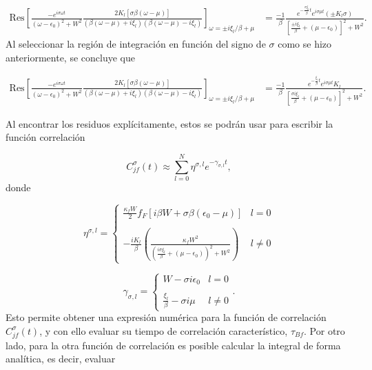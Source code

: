 \begin{appendixs}
\begin{align*}
    \text{Res} \left[ \frac{-e^{i\sigma \omega t}}{(\omega - \epsilon_{0})^{2} + W^{2} } \frac{ 2K_{l}[\sigma \beta (\omega-\mu)] }{ (\beta(\omega-\mu) + i \xi_{l} )(\beta(\omega-\mu) - i \xi_{l})} \right]_{\omega = \pm i \xi_{l}/\beta + \mu} & = \frac{-1}{\beta} \frac{e^{- \frac{\sigma \xi_{l}}{\beta}t} e^{i\sigma \mu t}(\pm K_{l}\sigma )}{ [ \frac{ \pm i\xi_{l}}{\beta} + (\mu - \epsilon_{0}) ]^{2} + W^{2} }.
\end{align*}
Al seleccionar la región de integración en función del signo de $\sigma$ como se hizo anteriormente, se concluye que

\begin{align*}
    \text{Res} \left[ \frac{-e^{i\sigma \omega t}}{(\omega - \epsilon_{0})^{2} + W^{2} } \frac{ 2K_{l}[\sigma \beta (\omega-\mu)] }{ (\beta(\omega-\mu) + i \xi_{l} )(\beta(\omega-\mu) - i \xi_{l})} \right]_{\omega = \pm i \xi_{l}/\beta + \mu} & = \frac{-1}{\beta} \frac{e^{- \frac{ \xi_{l}}{\beta}t} e^{i\sigma \mu t} K_{l} }{ [ \frac{ \sigma i\xi_{l}}{\beta} + (\mu - \epsilon_{0}) ]^{2} + W^{2} }. 
\end{align*}

Al encontrar los residuos explícitamente, estos se podrán usar para escribir la función correlación 

\begin{equation}
    C^{\sigma}_{jf}(t) \approx \sum_{l=0}^{N} \eta^{\sigma,l} e^{-\gamma_{\sigma,l} t},
    \label{correlationf}
\end{equation}
donde 

\begin{equation*}
    \eta^{\sigma,l} = \left\{ \begin{array}{lc} \frac{\kappa_{f}W}{2} f_{F}[i\beta W + \sigma \beta (\epsilon_{0}-\mu)]  & l = 0 \\ \\ - \frac{iK_{l}}{\beta} \left(\frac{\kappa_{f}W^{2}}{ (\frac{i\sigma \xi_{l}}{\beta} + (\mu-\epsilon_{0}))^{2} + W^{2} } \right) &  l \neq 0 \end{array} \right.
\end{equation*}

\begin{equation*}
    \gamma_{\sigma,l} =  \left\{ \begin{array}{lc} W- \sigma i \epsilon_{0}  & l = 0 \\ \\ \frac{\xi_{l}}{\beta} - \sigma i \mu &  l \neq 0 \end{array} \right..
\end{equation*}
Esto permite obtener una expresión numérica para la función de correlación $C^{\sigma}_{jf}(t)$, y con ello evaluar su tiempo de correlación característico, $\tau_{Bf}$. Por otro lado, para la otra función de correlación es posible calcular la integral de forma analítica, es decir, evaluar


\end{appendixs}
